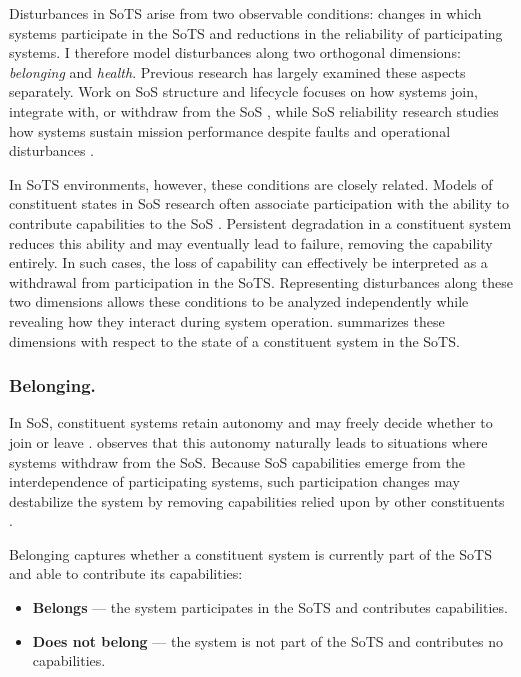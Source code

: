 Disturbances in SoTS arise from two observable conditions: changes in which systems participate in the SoTS and reductions in the reliability of participating systems. I therefore model disturbances along two orthogonal dimensions: \emph{belonging} and \emph{health}. Previous research has largely examined these aspects separately. Work on SoS structure and lifecycle focuses on how systems join, integrate with, or withdraw from the SoS \cite{axelsson2019refined,svenson2020situation,hristozov2023modeling}, while SoS reliability research studies how systems sustain mission performance despite faults and operational disturbances \cite{ferreira2024framework,uday2015designing,garro2014reliability,li2025reliability}.

In SoTS environments, however, these conditions are closely related. Models of constituent states in SoS research often associate participation with the ability to contribute capabilities to the SoS \cite{axelsson2019refined}. Persistent degradation in a constituent system reduces this ability and may eventually lead to failure, removing the capability entirely. In such cases, the loss of capability can effectively be interpreted as a withdrawal from participation in the SoTS. Representing disturbances along these two dimensions allows these conditions to be analyzed independently while revealing how they interact during system operation.  summarizes these dimensions with respect to the state of a constituent system in the SoTS.



\subsubsection{Belonging.}
In SoS, constituent systems retain autonomy and may freely decide whether to join or leave \cite{boardman2006system, baldwin2011formation}. \citet{salado2015abandonment} observes that this autonomy naturally leads to situations where systems withdraw from the SoS. Because SoS capabilities emerge from the interdependence of participating systems, such participation changes may destabilize the system by removing capabilities relied upon by other constituents \cite{salado2016exile}.

Belonging captures whether a constituent system is currently part of the SoTS and able to contribute its capabilities:

\begin{itemize}
    \item \textbf{Belongs} --- the system participates in the SoTS and contributes capabilities.
    \item \textbf{Does not belong} --- the system is not part of the SoTS and contributes no capabilities.
\end{itemize}

